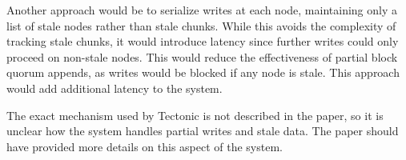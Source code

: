 \begin{itemize}
    Another approach would be to serialize writes at each node, maintaining only a list of stale nodes rather than stale chunks. While this avoids the complexity of tracking stale chunks, it would introduce latency since further writes could only proceed on non-stale nodes. This would reduce the effectiveness of partial block quorum appends, as writes would be blocked if any node is stale. This approach would add additional latency to the system.
    
    The exact mechanism used by Tectonic is not described in the paper, so it is unclear how the system handles partial writes and stale data. The paper should have provided more details on this aspect of the system.
\end{itemize}
